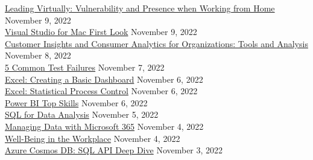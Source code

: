\documentclass[10pt]{res} %
\begin{document}
\begin{resume}
\href{https://www.linkedin.com/learning/certificates/35905bd0a07a32cb66878ece0939c3164f4fac4d7e5fea703f8e223a39cbddd8}{\color{blue}Leading Virtually: Vulnerability and Presence when Working from Home} \hfill November 9, 2022 \\
\href{https://www.linkedin.com/learning/certificates/19ff7edadf0503630ef93e845d27f5b0b0d83c17761350d69944da74873a95c4}{\color{blue}Visual Studio for Mac First Look} \hfill November 9, 2022 \\
\href{https://www.linkedin.com/learning/certificates/d34ff0c92846bc08e489b007ee5bedb3b868fc7350ae2ab7e78790187b36d64f}{\color{blue}Customer Insights and Consumer Analytics for Organizations: Tools and Analysis} \hfill November 8, 2022 \\
\href{https://www.linkedin.com/learning/certificates/7b85c9ad31dff97b6ef235ed0140f0a073a812876a28b565f9f65baa0a78abb6}{\color{blue}5 Common Test Failures} \hfill November 7, 2022 \\
\href{https://www.linkedin.com/learning/certificates/0d201d5460b64ad9b0ff5f2a572e10909754424a9162d9ba0929b6548f64b7a1}{\color{blue}Excel: Creating a Basic Dashboard} \hfill November 6, 2022 \\
\href{https://www.linkedin.com/learning/certificates/129efdd9de0252eeca2336f52dee23080bd37733880f589d197b4808ad2c674d}{\color{blue}Excel: Statistical Process Control} \hfill November 6, 2022 \\
\href{https://www.linkedin.com/learning/certificates/e72ffb4d1b8dbd0f01875253020e71bc8b5ba5501e11fe4e444445d93433896e}{\color{blue}Power BI Top Skills} \hfill November 6, 2022 \\
\href{https://www.linkedin.com/learning/certificates/48605dbae88383ccc715bcf5d476fb3852a4143c0163d29c9dbd13c0f7099541}{\color{blue}SQL for Data Analysis} \hfill November 5, 2022 \\
\href{https://www.linkedin.com/learning/certificates/7f968f61f8cc02e4f939a14115f3e63c621267ba0bcae98f4ee549b47d8546b0}{\color{blue}Managing Data with Microsoft 365} \hfill November 4, 2022 \\
\href{https://www.linkedin.com/learning/certificates/04b478d4a52f0cf17e42b381eb6fc2d2e7502c2512d12c8b82bb096553030d3b}{\color{blue}Well-Being in the Workplace} \hfill November 4, 2022 \\
\href{https://www.linkedin.com/learning/certificates/2cc1f2722645776b338a606ce5c2efbaa2381956ca925d4798ff4e7343adc138}{\color{blue}Azure Cosmos DB: SQL API Deep Dive} \hfill November 3, 2022 \\

\end{resume}
\end{document}
